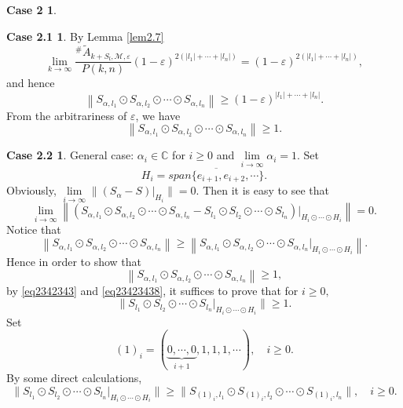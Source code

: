 \documentclass[11pt]{article}
\theoremstyle{plain}
\theoremstyle{definition}
\newtheorem*{case2}{Case 2}
\newtheorem*{case2.1}{Case 2.1}
\newtheorem*{case2.2}{Case 2.2}
\begin{document}
{\begin{case2}
\begin{case2.1}
		By Lemma \ref{lem2.7}
			$$ \lim\limits_{k\to \infty}\frac{^{\#  } \tilde{A}_{k+S_{\mathfrak{l}},\mathscr{M},\varepsilon }  }{P(k,n) }\left ( 1 - \varepsilon \right ) ^{2\left ( \left | l_{1} \right |  + \cdots +\left | l_{n} \right | \right ) } = \left ( 1 - \varepsilon \right ) ^{2\left ( \left | l_{1} \right | + \cdots +\left | l_{n} \right | \right ) },$$
		and hence $$\left \| S_{\alpha,{l_{1}}}\odot S_{\alpha,{l_{2}}}\odot \cdots \odot S_{\alpha,{l_{n}}}  \right \|  \ge \left ( 1 - \varepsilon \right ) ^{\left | l_{1} \right | + \cdots +\left | l_{n} \right |}.$$
		From the arbitrariness of $\varepsilon$, we have
		$$\left \|  S_{\alpha,{l_{1}}}\odot S_{\alpha,{l_{2}}}\odot \cdots \odot S_{\alpha,{l_{n}}}  \right \|  \ge 1.$$

\end{case2.1}
\begin{case2.2} General case: 
$\alpha_i \in \mathbb{C}$ for $i\geq 0$ and $\lim\limits_{i\to\infty}\alpha_i=1$.
Set  $$H_i=\overline{span\{e_{i+1},e_{i+2},\cdots\}}.$$
Obviously, $\lim\limits_{i\rightarrow \infty}\|(S_{\alpha}-S)|_{H_i}\|=0.$ 
Then it is easy to see that
\begin{equation}\label{eq2342343}\lim\limits_{i\rightarrow \infty}\left \|  (S_{\alpha,{l_{1}}}\odot S_{\alpha,{l_{2}}}\odot \cdots \odot S_{\alpha,{l_{n}}}-S_{{l_{1}}}\odot S_{{l_{2}}}\odot \cdots \odot S_{{l_{n}}})|_{H_i\odot \cdots \odot H_i}  \right \|=0.\end{equation}
Notice that \begin{equation}\label{eq23423438}\left \|  S_{\alpha,{l_{1}}}\odot S_{\alpha,{l_{2}}}\odot \cdots \odot S_{\alpha,{l_{n}}}\right\|\geq \left \|  S_{\alpha,{l_{1}}}\odot S_{\alpha,{l_{2}}}\odot \cdots \odot S_{\alpha,{l_{n}}}|_{H_i
\odot \cdots \odot H_i}\right\|.\end{equation} 
Hence in order to show that $$\left \|  S_{\alpha,{l_{1}}}\odot S_{\alpha,{l_{2}}}\odot \cdots \odot S_{\alpha,{l_{n}}}\right\|\geq 1,$$ by \eqref{eq2342343} and \eqref{eq23423438}, it suffices to prove that for $i\geq 0,$ \begin{equation}\label{eq2342345}\|S_{{l_{1}}}\odot S_{{l_{2}}}\odot \cdots \odot S_{{l_{n}}}|_{H_i\odot \cdots \odot H_i}\|\geq 1.\end{equation}
Set $$(1)_i=\left( \underbrace{0,\cdots,0 }_{i+1} ,1,1,1,\cdots \right), \quad i\geq 0.$$
By some direct calculations, 
\begin{equation}\label{eq234234}\|S_{{l_{1}}}\odot S_{{l_{2}}}\odot \cdots \odot S_{{l_{n}}}|_{H_i\odot \cdots \odot H_i}\|\geq \|S_{(1)_i,{l_{1}}}\odot S_{(1)_i,{l_{2}}}\odot \cdots \odot S_{(1)_i,{l_{n}}}\|, \quad i\geq0.\end{equation}

\end{case2.2}
\end{case2}}
\end{document}
